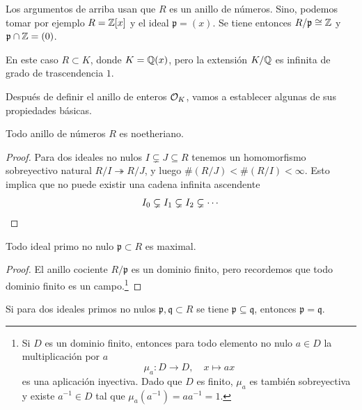 \begin{comentario}
  Los argumentos de arriba usan que $R$ es un anillo de números. Sino, podemos
  tomar por ejemplo $R = \mathbb{Z}[x]$ y el ideal $\mathfrak{p} = (x)$. Se tiene
  entonces $R/\mathfrak{p} \cong \mathbb{Z}$ y $\mathfrak{p} \cap \mathbb{Z} = (0)$.

  En este caso $R \subset K$, donde $K = \mathbb{Q} (x)$, pero la extensión $K/\mathbb{Q}$
  es infinita de grado de trascendencia $1$.
\end{comentario}


Después de definir el anillo de enteros $\mathcal{O}_K$, vamos a establecer algunas
de sus propiedades básicas.

\begin{corolario}
  Todo anillo de números $R$ es noetheriano.

  \begin{proof}
    Para dos ideales no nulos $I\subsetneq J\subseteq R$ tenemos un homomorfismo
    sobreyectivo natural ${R/I\twoheadrightarrow R/J}$,
    y luego $\# (R/J) < \# (R/I) < \infty$.  Esto implica que no puede existir
    una cadena infinita ascendente
    \[ I_0 \subsetneq I_1 \subsetneq I_2 \subsetneq \cdots \qedhere \]
  \end{proof}
\end{corolario}

\begin{corolario}
  Todo ideal primo no nulo $\mathfrak{p} \subset R$ es maximal.

  \begin{proof}
    El anillo cociente $R/\mathfrak{p}$ es un dominio finito, pero recordemos
    que todo dominio finito es un campo.\footnote{Si $D$ es un dominio finito,
      entonces para todo elemento no nulo $a \in D$ la multiplicación por $a$
    $$\mu_a\colon D \to D, \quad x \mapsto ax$$ es una aplicación
    inyectiva. Dado que $D$ es finito, $\mu_a$ es también sobreyectiva y existe
    $a^{-1} \in D$ tal que $\mu_a (a^{-1}) = a a^{-1} = 1$.}
  \end{proof}
\end{corolario}

\begin{corolario}
  Si para dos ideales primos no nulos $\mathfrak{p}, \mathfrak{q} \subset R$ se
  tiene $\mathfrak{p} \subseteq \mathfrak{q}$, entonces $\mathfrak{p} =
  \mathfrak{q}$.
\end{corolario}

